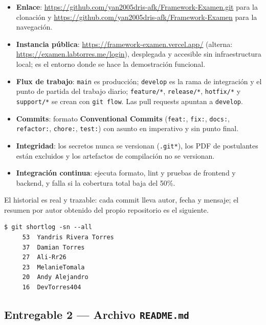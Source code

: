 \documentclass[11pt,a4paper]{article}
\newcommand{\ent}[1]{\textsf{\textbf{#1}}}
\newcommand{\code}[1]{\texttt{#1}}
\newcommand{\ruta}[1]{\path{#1}}
\begin{document}
\begin{itemize}
  \item \textbf{Enlace}: \url{https://github.com/yan2005dris-afk/Framework-Examen.git} para la clonaci\'on
        y \url{https://github.com/yan2005dris-afk/Framework-Examen} para la navegaci\'on.
  \item \textbf{Instancia p\'ublica}: \url{https://framework-examen.vercel.app/} (alterna:
        \url{https://examen.labtorres.me/login}), desplegada y
        accesible sin infraestructura local; es el entorno donde se hace la demostraci\'on funcional.
  \item \textbf{Flux de trabajo}: \code{main} es producci\'on; \code{develop} es la rama de integraci\'on
        y el punto de partida del trabajo diario; \code{feature/*}, \code{release/*}, \code{hotfix/*} y
        \code{support/*} se crean con \code{git flow}. Las pull requests apuntan a \code{develop}.
  \item \textbf{Commits}: formato \ent{Conventional Commits} (\code{feat:}, \code{fix:}, \code{docs:},
        \code{refactor:}, \code{chore:}, \code{test:}) con asunto en imperativo y sin punto final.
  \item \textbf{Integridad}: los secretos nunca se versionan (\code{.git*}), los PDF de postulantes est\'an
        excluidos y los artefactos de compilaci\'on no se versionan.
  \item \textbf{Integraci\'on continua}: \ruta{.github/workflows/ci.yml} ejecuta formato, lint y pruebas
        de frontend y backend, y falla si la cobertura total baja del 50\%.
\end{itemize}

El historial es real y trazable: cada commit lleva autor, fecha y mensaje; el resumen por autor
obtenido del propio repositorio es el siguiente.

\begin{lstlisting}[language=bshlite,caption={Historial por autor (git shortlog -sn --all)}]
$ git shortlog -sn --all
     53  Yandris Rivera Torres
     37  Damian Torres
     27  Ali-Rr26
     23  MelanieTomala
     20  Andy Alejandro
     16  DevTorres404
\end{lstlisting}

\subsection{Entregable 2 --- Archivo \code{README.md}}
\end{document}
